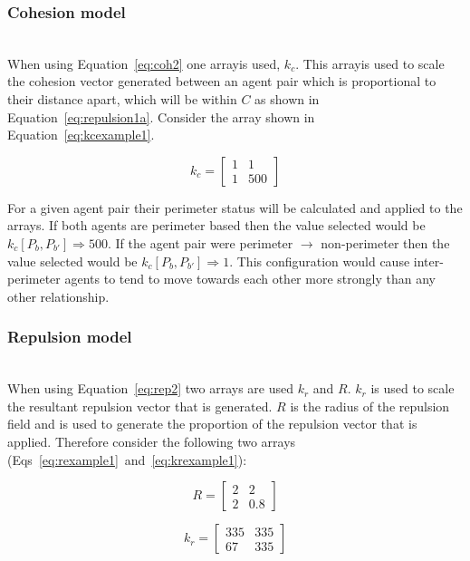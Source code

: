 \documentclass[12pt,a4paper]{IEEEtran}
\newcommand{\kc}{\mathit{k_c}}
\newcommand{\kr}{\mathit{k_r}}
\newcommand{\rb}{\mathit{R}}
\begin{document}
\subsubsection{Cohesion model}~\\
When using Equation~\ref{eq:coh2} one arrayis used, $k_c$. This arrayis used to scale the cohesion vector generated between an agent pair which is proportional to their distance apart, which will be within $C$ as shown in Equation~\ref{eq:repulsion1a}. Consider the array shown in Equation~\ref{eq:kcexample1}.

\begin{equation}\label{eq:kcexample1}
	\kc = 
	\begin{bmatrix}
	1 & 1\\
	1 & 500
	\end{bmatrix}
\end{equation}

For a given agent pair their perimeter status will be calculated and applied to the arrays. If both agents are perimeter based then the value selected would be $k_c[P_b,P_{b'}]\Rightarrow 500$. If the agent pair were perimeter $\rightarrow$ non-perimeter then the value selected would be $k_c[P_b,P_{b'}]\Rightarrow 1$. This configuration would cause inter-perimeter agents to tend to move towards each other more strongly than any other relationship.

\subsubsection{Repulsion model}~\\
When using Equation~\ref{eq:rep2} two arrays are used $\kr$ and $\rb$. $\kr$ is used to scale the resultant repulsion vector that is generated. $\rb$ is the radius of the repulsion field and is used to generate the proportion of the repulsion vector that is applied. Therefore consider the following two arrays (Eqs~\ref{eq:rexample1}~and~\ref{eq:krexample1}):

\begin{equation}\label{eq:rexample1}
	\rb = 
	\begin{bmatrix}
	2 & 2\\
	2 & 0.8
	\end{bmatrix}
\end{equation}

\begin{equation}\label{eq:krexample1}
	\kr = 
	\begin{bmatrix}
	335 & 335\\
	67 & 335
	\end{bmatrix}
\end{equation}
\end{document}
